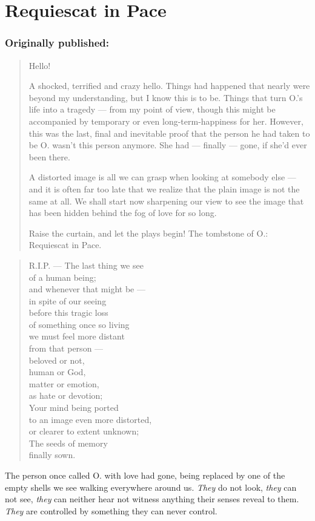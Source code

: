 \chapter{Requiescat in Pace}
\label{cha:requiescat-in-pace}
\subsection*{Originally published: }
\begin{quote}
Hello! 

A shocked, terrified and crazy hello. Things had happened that nearly were beyond my understanding, but I know this is to be. Things that turn O.'s life into a tragedy --- from my point of view, though this might be accompanied by temporary or even long-term-happiness for her. However, this was the last, final and inevitable proof that the person he had taken to be O. wasn't this person anymore. She had --- finally --- gone, if she'd ever been there.

A distorted image is all we can grasp when looking at somebody else --- and it is often far too late that we realize that the plain image is not the same at all. 
We shall start now sharpening our view to see the image that has been hidden behind the fog of love for so long.

Raise the curtain, and let the plays begin! The tombstone of O.: Requiescat in Pace.
\end{quote}

\begin{verse}
R.I.P. --- The last thing we see \\
of a human being; \\
and whenever that might be --- \\
in spite of our seeing \\
before this tragic loss \\
of something once so living \\
we must feel more distant \\
from that person --- \\
beloved or not, \\
human or God, \\
matter or emotion, \\
as hate or devotion; \\
Your mind being ported \\
to an image even more distorted, \\
or clearer to extent unknown; \\
The seeds of memory \\
finally sown.   
\end{verse}
The person once called O. with love had gone, being replaced by one of the empty shells we see walking everywhere around us. \emph{They} do not look, \emph{they} can not see, \emph{they} can neither hear not witness anything their senses reveal to them. \emph{They} are controlled by something they can never control.

